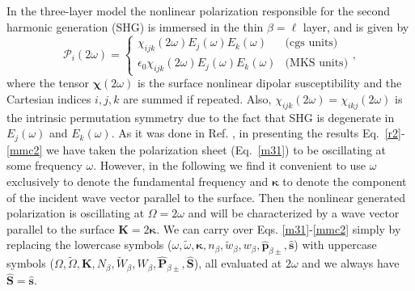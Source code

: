 In the three-layer model the nonlinear polarization responsible for 
the second harmonic generation (SHG) is immersed in the thin $\beta=\ell$
layer, and is given by 
\begin{equation}\label{tres}
\mathcal{P}_i(2\omega)=
\left\{
\begin{array}{cc}
\chi_{ijk}(2\omega)E_{j}(\omega)E_{k}(\omega) & \text{(cgs units)} \\
\epsilon_{0}\chi_{ijk}(2\omega)E_{j}(\omega)E_{k}(\omega) & \text{(MKS units)}
\end{array}
\right.
,
\end{equation}
where the  
tensor $\boldsymbol{\chi}(2\omega)$ is the surface nonlinear  
dipolar susceptibility and the Cartesian indices $i,j,k$ are summed if repeated. 
Also, $\chi_{ijk}(2\omega)=\chi_{ikj}(2\omega)$ 
is the intrinsic permutation symmetry
due to the fact that SHG is degenerate in $E_j(\omega)$ and $E_k(\omega)$.
As it was done in Ref. \cite{mizrahiJOSA88},
in presenting the results Eq.~\eqref{r2}-\eqref{mmc2}
we have taken the
polarization sheet (Eq.~\eqref{m31}) to be oscillating at some frequency
$\omega$. However,
 in the following we find it convenient to use $\omega$
exclusively to denote the fundamental frequency and
$\boldsymbol{\kappa}$
 to denote the
component of the incident wave vector parallel to the surface. Then
the nonlinear 
generated polarization is oscillating at $\Omega= 2\omega$
and will be characterized
by a wave vector parallel to the surface 
$\mathbf{K}=2\boldsymbol{\kappa}$. 
We can carry over
Eqs. \eqref{m31}-\eqref{mmc2} 
simply by replacing the lowercase symbols 
($\omega,\tilde\omega,\boldsymbol{\kappa},n_{\beta},\tilde w_{\beta},w_{\beta},\hat{\mathbf{p}}_{\beta\pm},\hat{\mathbf{s}}$)  
with uppercase symbols 
($\Omega,\tilde\Omega,\mathbf{K},N_{\beta},\tilde W_{\beta},W_{\beta},\hat{\mathbf{P}}_{\beta\pm},\hat{\mathbf{S}}$),
all evaluated at $2\omega$ and
we always have $\hat{\mathbf{S}}=\hat{\mathbf{s}}$.

